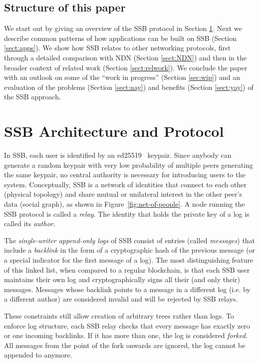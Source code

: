 \documentclass[9pt,sigconf]{acmart}
\begin{document}
\subsection*{Structure of this paper}

We start out by giving an overview of the SSB protocol in Section \ref{sect:architecture}. Next we describe common patterns of how applications can be built on SSB (Section \ref{sect:apps}). We show how SSB relates to other networking protocols, first through a detailed comparison with NDN (Section \ref{sect:NDN}) and then in the broader context of related work (Section \ref{sect:relwork}). We conclude the paper with an outlook on some of the ``work in progress'' (Section \ref{sec:wip}) and an evaluation of the problems (Section \ref{sect:nay}) and benefits (Section \ref{sect:yay}) of the SSB approach.


\section{SSB Architecture and Protocol}
\label{sect:architecture}

In SSB, each user is identified by an ed25519~\cite{bernstein2012high} keypair. Since anybody can generate a random keypair with very low probability of multiple peers generating the same keypair, no central authority is necessary for introducing users to the system. Conceptually, SSB is a network of identities that connect to each other (physical topology) and share mutual or unilateral interest in the other peer's data (social graph), as shown in Figure~\ref{fig:net-of-people}. A node running the SSB protocol is called a \textit{relay}. The identity that holds the private key of a log is called its \textit{author}.

The {\em single-writer append-only logs} of SSB consist of entries (called \textit{messages}) that include a {\em backlink} in the form of a cryptographic hash of the previous message (or a special indicator for the first message of a log). The most distinguishing feature of this linked list, when compared to a regular blockchain, is that each SSB user maintains their own log and cryptographically signs all their (and only their) messages. Messages whose backlink points to a message in a different log (i.e. by a different author) are considered invalid and will be rejected by SSB relays.

These constraints still allow creation of arbitrary trees rather than logs. To enforce log structure, each SSB relay checks that every message has exactly zero or one incoming backlinks. If it has more than one, the log is considered {\em forked}. All messages from the point of the fork onwards are ignored, the log cannot be appended to anymore.
\end{document}
